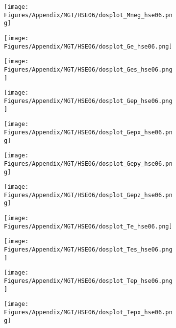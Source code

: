 \begin{figure}[H]
\begin{subfigure}{0.24\textwidth}
    \texttt{[image: Figures/Appendix/MGT/HSE06/dosplot\_Mneg\_hse06.png]}
    \label{dosplot_Mneg_hse06}
\end{subfigure}
\hfill
\begin{subfigure}{0.24\textwidth}
    \texttt{[image: Figures/Appendix/MGT/HSE06/dosplot\_Ge\_hse06.png]}
    \label{dosplot_MnGe_hse06}
\end{subfigure}
\hfill
\begin{subfigure}{0.24\textwidth}
    \texttt{[image: Figures/Appendix/MGT/HSE06/dosplot\_Ges\_hse06.png]}
    \label{dosplot_MnGes_hse06}
\end{subfigure}
\hfill
\begin{subfigure}{0.24\textwidth}
    \texttt{[image: Figures/Appendix/MGT/HSE06/dosplot\_Gep\_hse06.png]}
    \label{dosplot_MnGep_hse06}
\end{subfigure}
\hfill
\begin{subfigure}{0.24\textwidth}
    \texttt{[image: Figures/Appendix/MGT/HSE06/dosplot\_Gepx\_hse06.png]}
    \label{dosplot_MnGepx_hse06}
\end{subfigure}
\hfill
\begin{subfigure}{0.24\textwidth}
    \texttt{[image: Figures/Appendix/MGT/HSE06/dosplot\_Gepy\_hse06.png]}
    \label{dosplot_MnGepy_hse06}
\end{subfigure}
\hfill
\begin{subfigure}{0.24\textwidth}
    \texttt{[image: Figures/Appendix/MGT/HSE06/dosplot\_Gepz\_hse06.png]}
    \label{dosplot_MnGepz_hse06}
\end{subfigure}
\hfill
\begin{subfigure}{0.24\textwidth}
    \texttt{[image: Figures/Appendix/MGT/HSE06/dosplot\_Te\_hse06.png]}
    \label{dosplot_MnTe_hse06}
\end{subfigure}
\hfill
\begin{subfigure}{0.24\textwidth}
    \texttt{[image: Figures/Appendix/MGT/HSE06/dosplot\_Tes\_hse06.png]}
    \label{dosplot_MnTes_hse06}
\end{subfigure}
\hfill
\begin{subfigure}{0.24\textwidth}
    \texttt{[image: Figures/Appendix/MGT/HSE06/dosplot\_Tep\_hse06.png]}
    \label{dosplot_MnTep_hse06}
\end{subfigure}
\hfill
\begin{subfigure}{0.24\textwidth}
    \texttt{[image: Figures/Appendix/MGT/HSE06/dosplot\_Tepx\_hse06.png]}

\end{subfigure}
\end{figure}
